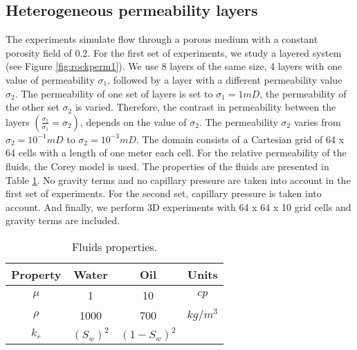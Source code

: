 \documentclass[12pt]{article}
\begin{document}
\subsection*{Heterogeneous permeability layers}
The experiments simulate flow through a porous medium with a constant porosity field of 0.2.
For the first set of experiments, we study a layered system (see Figure \ref{fig:rockperm1}). We use 8 layers of the same size, 
4 layers with one value of permeability $\sigma_1$, followed by a layer with a different permeability value $\sigma_2$. The permeability of one set of layers is set to $\sigma_1=1mD$, the permeability of the other set $\sigma_2$ is varied. 
Therefore, the contrast in permeability between the layers $(\frac{\sigma_2}{\sigma_1}=\sigma_2)$,
depends on the value of $\sigma_2$.
The permeability $\sigma_2$ varies from $\sigma_2=10^{-1}mD$ to $\sigma_2=10^{-3}mD$. 
The domain consists of a Cartesian grid of 64 x 64 cells with a length of one meter each cell. For the relative permeability of the fluids, the Corey model is used. The properties of the fluids are presented in Table \ref{table:fluids}. No gravity terms and no capillary pressure are taken into account in the first set of experiments.
For the second set, capillary pressure is taken into account. And finally, we perform 3D experiments with 64 x 64 x 10 grid cells and gravity terms are included. 
\begin{table}[!ht]
\hspace{1cm}
\begin{minipage}{.9\textwidth}%
\centering
\begin{tabular}{ |c|c|c|c|} 
\hline
Property&Water&Oil&Units\\
\hline
$\mu$&     1&    10 & $cp$  \\  
$\rho$& 1000& 700& $kg/m^3$\\
$k_r$&$(S_w)^2$&   $(1-S_w)^2$ &  \\
\hline
\end{tabular}
\caption{Fluids properties.}\label{table:fluids}
\end{minipage} \hspace{1cm} 
\end{table} 
\end{document}

